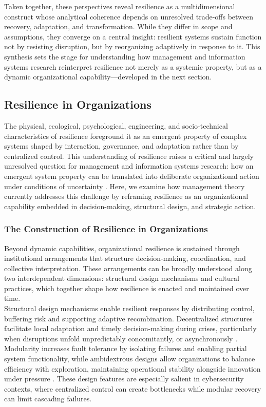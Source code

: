 Taken together, these perspectives reveal resilience as a multidimensional construct whose analytical coherence depends on unresolved trade-offs between recovery, adaptation, and transformation. While they differ in scope and assumptions, they converge on a central insight: resilient systems sustain function not by resisting disruption, but by reorganizing adaptively in response to it. This synthesis sets the stage for understanding how management and information systems research reinterpret resilience not merely as a systemic property, but as a dynamic organizational capability—developed in the next section.

\subsection{Resilience in Organizations}
The physical, ecological, psychological, engineering, and socio-technical characteristics of resilience foreground it as an emergent property of complex systems shaped by interaction, governance, and adaptation rather than by centralized control. This understanding of resilience raises a critical and largely unresolved question for management and information systems research: how an emergent system property can be translated into deliberate organizational action under conditions of uncertainty \autocite{lengnick2011developing, duchek2020organizational}. Here, we examine how management theory currently addresses this challenge by reframing resilience as an organizational capability embedded in decision-making, structural design, and strategic action.\\

\subsubsection{The Construction of Resilience in Organizations}

Beyond dynamic capabilities, organizational resilience is sustained through institutional arrangements that structure decision-making, coordination, and collective interpretation. These arrangements can be broadly understood along two interdependent dimensions: structural design mechanisms and cultural practices, which together shape how resilience is enacted and maintained over time.\\

Structural design mechanisms enable resilient responses by distributing control, buffering risk and supporting adaptive recombination. Decentralized structures facilitate local adaptation and timely decision-making during crises, particularly when disruptions unfold unpredictably concomitantly,  or asynchronously \autocite{boin2013resilient}. Modularity increases fault tolerance by isolating failures and enabling partial system functionality, while ambidextrous designs allow organizations to balance efficiency with exploration, maintaining operational stability alongside innovation under pressure \autocite{bhamra2011resilience}. These design features are especially salient in cybersecurity contexts, where centralized control can create bottlenecks while modular recovery can limit cascading failures.\\

